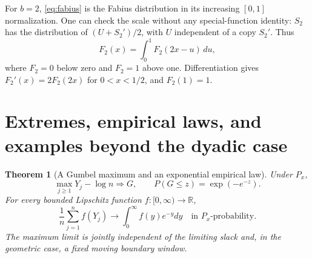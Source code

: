 \documentclass[11pt,letterpaper]{article}
\numberwithin{equation}{section}
\newtheorem{theorem}{Theorem}[section]
\theoremstyle{definition}
\theoremstyle{remark}
\newcommand{\RR}{\mathbb R}
\begin{document}
For $b=2$, \eqref{eq:fabius} is the Fabius distribution in its increasing
$[0,1]$ normalization. One can check the scale without any special-function
identity: $S_2$ has the distribution of $(U+S_2')/2$, with $U$ independent
of a copy $S_2'$. Thus
\[
 F_2(x)=\int_0^1 F_2(2x-u)\,du,
\]
where $F_2=0$ below zero and $F_2=1$ above one. Differentiation gives
$F_2'(x)=2F_2(2x)$ for $0<x<1/2$, and $F_2(1)=1$.

\section{Extremes, empirical laws, and examples beyond the dyadic case}
\label{sec:extreme}

\begin{theorem}[A Gumbel maximum and an exponential empirical law]
\label{thm:extremes}
Under $P_x$,
\begin{equation}
 \max_{j\ge1}Y_j-\log n\Rightarrow G,
 \qquad P(G\le z)=\exp(-e^{-z}).
 \label{eq:gumbel}
\end{equation}
For every bounded Lipschitz function $f:[0,\infty)\to\RR$,
\begin{equation}
 \frac1n\sum_{j=1}^n f(Y_j)
 \longrightarrow\int_0^\infty f(y)e^{-y}dy
 \quad\text{in }P_x\text{-probability}.
 \label{eq:empirical}
\end{equation}
The maximum limit is jointly independent of the limiting slack and, in the
geometric case, a fixed moving boundary window.
\end{theorem}
\end{document}
